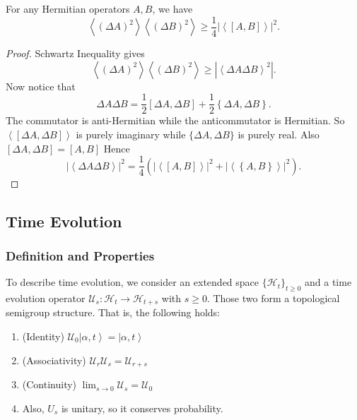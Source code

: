 \begin{theorem}
	For any Hermitian operators $A, B$, we have
	\[
		\left\langle (\Delta A)^2 \right\rangle \left\langle (\Delta B)^2 \right\rangle 
		\ge \frac{1}{4} \left| \left\langle [A,B] \right\rangle  \right| ^2
	.\] 
\end{theorem}
\begin{proof}
	Schwartz Inequality gives
	\[
		\left\langle (\Delta A)^2 \right\rangle \left\langle (\Delta B)^2 \right\rangle \ge 
		\left| \left\langle \Delta A \Delta B \right\rangle ^2 \right| 
	.\] 
	Now notice that 
	\[
		\Delta A \Delta B = \frac{1}{2} [\Delta A, \Delta B] + \frac{1}{2} \left\{ \Delta A, \Delta B \right\} 
	.\] 
	The commutator is anti-Hermitian while the anticommutator is Hermitian. So $\left\langle [\Delta A,\Delta B] \right\rangle $ is purely imaginary while $\{\Delta A,\Delta B\} $ is purely real. Also $[\Delta A, \Delta B] = [A, B]$ Hence
	\[
		\left| \left\langle \Delta A \Delta B \right\rangle  \right| ^2 = \frac{1}{4} \left( \left| \left\langle [A,B] \right\rangle  \right| ^2 + 
		\left| \left\langle \left\{ A,B \right\}  \right\rangle \right|  ^2\right) 
	.\] 
\end{proof}





\subsection{Time Evolution}

\subsubsection{Definition and Properties}



To describe time evolution, we consider an extended space $\{\mathcal{H}_t\} _{t \ge 0}$ and a time evolution operator $\mathcal{U}_{s}: \mathcal{H}_t \to \mathcal{H}_{t + s}$ with $s \ge 0$. Those two form a topological semigroup structure. That is, the following holds:
\begin{enumerate}
	\item (Identity) $\mathcal{U}_0 \left| \alpha, t \right\rangle  = \left| \alpha, t \right\rangle $
	\item (Associativity) $\mathcal{U}_r \mathcal{U}_s = \mathcal{U}_{r + s}$
	\item (Continuity) $\lim_{s \to 0} \mathcal{U}_s = \mathcal{U}_0$
	\item Also, $U_s$ is unitary, so it conserves probability.
\end{enumerate}

